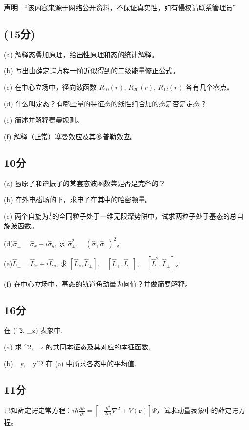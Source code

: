 
\textbf{声明}：“该内容来源于网络公开资料，不保证真实性，如有侵权请联系管理员”



\subsection{(15分)}

(a) 解释态叠加原理，给出性原理和态的统计解释。

(b) 写出由薛定谔方程一阶近似得到的二级能量修正公式。

(c) 在中心立场中，径向波函数 $R_{10}(r)$, $R_{20}(r)$, $R_{12}(r)$ 各有几个零点。

(d) 什么叫定态？有哪些量的特征态的线性组合加的态是否是定态？

(e) 简述并解释费曼规则。

(f) 解释（正常）塞曼效应及其多普勒效应。

\subsection{10分}

(a) 氢原子和谐振子的某套态波函数集是否是完备的？

(b) 在外电磁场的下，求电子在其中的哈密顿量。

(c) 两个自旋为$\frac{1}{2}$的全同粒子处于一维无限深势阱中，试求两粒子处于基态的总自旋波函数。

(d)$\hat{\sigma}_{\pm} = \hat{\sigma}_x \pm i \hat{\sigma}_y
$, 求 $\hat{\sigma}_{\pm}^2,\quad (\hat{\sigma}_+ \hat{\sigma}_-)^2$。

(e)$\hat{L}_{\pm} = \hat{L}_x \pm i \hat{L}_y$,  求 $[\hat{L}_z, \hat{L}_\pm],\quad [\hat{L}_+,\hat{L}_-], \quad [\hat{L}^2, \hat{L}_\pm]$。

(f) 在中心立场中，基态的轨道角动量为何值？并做简要解释。


\subsection{16分}
在 (^2, _z) 表象中,

(a) 求 ^2, _z 的共同本征态及其对应的本征函数,

(b) _y, _y^2 在 (a) 中所求各态中的平均值.

\subsection{11分}
已知薛定谔定常方程：$i\hbar \frac{\partial \psi}{\partial t} = \left[ -\frac{\hbar^2}{2m} \nabla^2 + V(\mathbf{r}) \right] \Psi$，试求动量表象中的薛定谔方程。

